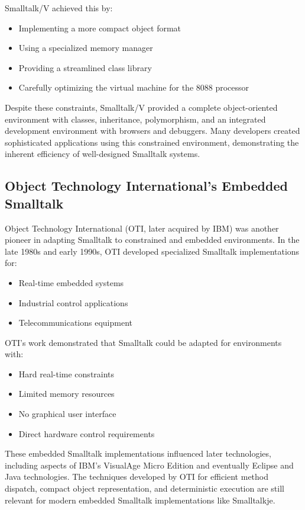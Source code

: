 \documentclass[12pt,a4paper]{report}
\begin{document}
Smalltalk/V achieved this by:
\begin{itemize}
    \item Implementing a more compact object format
    \item Using a specialized memory manager
    \item Providing a streamlined class library
    \item Carefully optimizing the virtual machine for the 8088 processor
\end{itemize}

Despite these constraints, Smalltalk/V provided a complete object-oriented environment with classes, inheritance, polymorphism, and an integrated development environment with browsers and debuggers. Many developers created sophisticated applications using this constrained environment, demonstrating the inherent efficiency of well-designed Smalltalk systems.

\subsection{Object Technology International's Embedded Smalltalk}

Object Technology International (OTI, later acquired by IBM) was another pioneer in adapting Smalltalk to constrained and embedded environments. In the late 1980s and early 1990s, OTI developed specialized Smalltalk implementations for:

\begin{itemize}
    \item Real-time embedded systems
    \item Industrial control applications
    \item Telecommunications equipment
\end{itemize}

OTI's work demonstrated that Smalltalk could be adapted for environments with:
\begin{itemize}
    \item Hard real-time constraints
    \item Limited memory resources
    \item No graphical user interface
    \item Direct hardware control requirements
\end{itemize}

These embedded Smalltalk implementations influenced later technologies, including aspects of IBM's VisualAge Micro Edition and eventually Eclipse and Java technologies. The techniques developed by OTI for efficient method dispatch, compact object representation, and deterministic execution are still relevant for modern embedded Smalltalk implementations like Smalltalkje.
\end{document}
